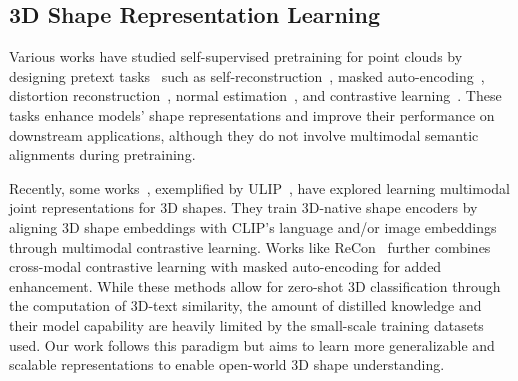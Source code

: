 \vspace{-0.5em}
\subsection{3D Shape Representation Learning}
\vspace{-0.5em}

Various works have studied self-supervised pretraining for point clouds by designing pretext tasks~\cite{eckart2021self,thabet2020self,poursaeed2020self,achituve2021self,sharma2020self} such as self-reconstruction~\cite{rao2020global,deng2018ppf,achlioptas2018learning,wang2021unsupervised}, masked auto-encoding~\cite{pang2022masked,yu2022point,hess2023masked}, distortion reconstruction~\cite{sauder2019self,mersch2022self,sun2021point}, normal estimation~\cite{rao2020global}, and contrastive learning~\cite{zhang2021self,sanghi2020info3d,xie2020pointcontrast}. These tasks enhance models' shape representations and improve their performance on downstream applications, although they do not involve multimodal semantic alignments during pretraining. 

Recently, some works~\cite{qi2023contrast,xue2022ulip,hegde2023clip}, exemplified by ULIP~\cite{xue2022ulip}, have explored learning multimodal joint representations for 3D shapes. They train 3D-native shape encoders by aligning 3D shape embeddings with CLIP's language and/or image embeddings through multimodal contrastive learning. Works like ReCon~\cite{qi2023contrast} further combines cross-modal contrastive learning with masked auto-encoding for added enhancement. While these methods allow for zero-shot 3D classification through the computation of 3D-text similarity, the amount of distilled knowledge and their model capability are heavily limited by the small-scale training datasets used. Our work follows this paradigm but aims to learn more generalizable and scalable representations to enable open-world 3D shape understanding.

